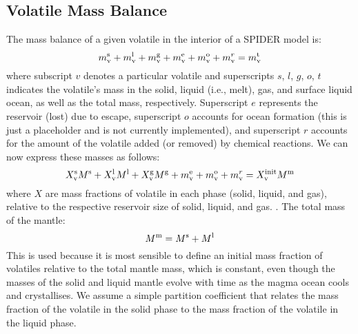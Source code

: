 
\noindent {}

\subsection{Volatile Mass Balance}
The mass balance of a given volatile in the interior of a SPIDER model \citep[e.g.,][]{LMC13} is:
\begin{equation}
m_{\rm v}^{\rm s} + m_{\rm v}^{\rm l} + m_{\rm v}^{\rm g} + m_{\rm v}^{\rm e} + m_{\rm v}^{\rm o} + m_{\rm v}^r= m_{\rm v}^{\rm t}
\end{equation}
where subscript $v$ denotes a particular volatile and superscripts $s$, $l$, $g$, $o$, $t$ indicates the volatile's mass in the solid, liquid (i.e., melt), gas, and surface liquid ocean, as well as the total mass, respectively.  Superscript $e$ represents the reservoir (lost) due to escape, superscript $o$ accounts for ocean formation (this is just a placeholder and is not currently implemented), and superscript $r$ accounts for the amount of the volatile added (or removed) by chemical reactions.  We can now express these masses as follows:
\begin{equation}
X_{\rm v}^{\rm s} M^{\rm s} + X_{\rm v}^{\rm l} M^{\rm l} + X_{\rm v}^{\rm g} M^{\rm g} + m_{\rm v}^{\rm e} + m_{\rm v}^{\rm o} + m_{\rm v}^r = X_{\rm v}^{\rm init} M^{\rm m}
\end{equation}
where $X$ are mass fractions of volatile in each phase (solid, liquid, and gas), relative to the respective  reservoir size of solid, liquid, and gas.  . The total mass of the mantle:
\begin{equation}
M^{\rm m} = M^{\rm s} + M^{\rm l}
\end{equation}
This is used because it is most sensible to define an initial mass fraction of volatiles relative to the total mantle mass, which is constant, even though the masses of the solid and liquid mantle evolve with time as the magma ocean cools and crystallises.  We assume a simple partition coefficient that relates the mass fraction of the volatile in the solid phase to the mass fraction of the volatile in the liquid phase.
